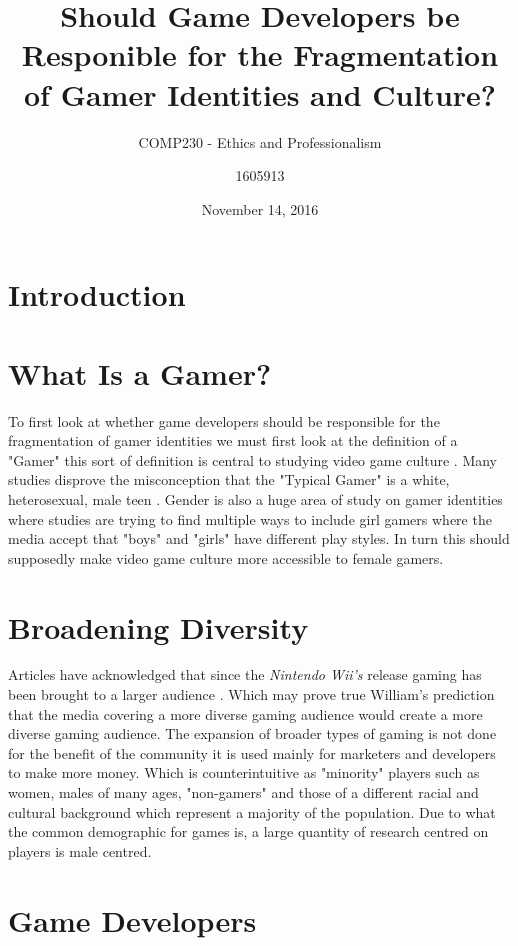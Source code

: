 \documentclass[11pt]{scrartcl}
\title{Should Game Developers be Responible for the Fragmentation of Gamer Identities and Culture?}
\date{November 14, 2016}
\subtitle{COMP230 - Ethics and Professionalism}
\author{1605913}
\begin{document}
\maketitle


\section{Introduction}


\section{What Is a Gamer?}

To first look at whether game developers should be responsible for the fragmentation of gamer identities we must first look at the definition of a "Gamer" this sort of definition is central to studying video game culture \cite{shaw2010video}. Many studies disprove the misconception that the "Typical Gamer" is a white, heterosexual, male teen \cite{JCC4:JCC4428}. Gender is also a huge area of study on gamer identities where studies are trying to find multiple ways to include girl gamers where the media accept that "boys" and "girls" have different play styles. In turn this should supposedly make video game culture more accessible to female gamers.\cite{cassell2000barbie}


\section{Broadening Diversity}

Articles have acknowledged that since the \emph{Nintendo Wii's} release gaming has been brought to a larger audience \cite{schiesel_2007}. Which may prove true William's prediction that the media covering a more diverse gaming audience would create a more diverse gaming audience. \cite{williams2003video} The expansion of broader types of gaming is not done for the benefit of the community it is used mainly for marketers and developers to make more money.\cite{elliott_2005} Which is counterintuitive as "minority" players such as women, males of many ages, "non-gamers" and those of a different racial and cultural background which represent a majority of the population.\cite{fron2007hegemony} Due to what the common demographic for games is, a large quantity of research centred on players is male centred.\cite{fron2007hegemony}


\section{Game Developers}
\end{document}
